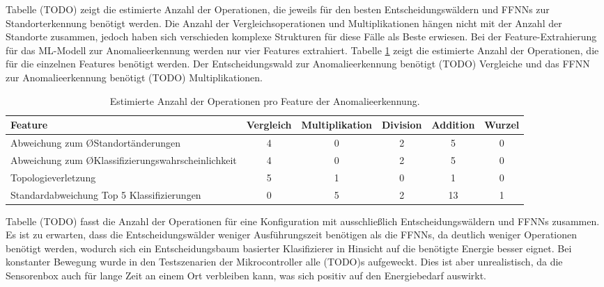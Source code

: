 \newline
\newline
Tabelle (TODO) zeigt die estimierte Anzahl der Operationen, die jeweils für den besten Entscheidungswäldern und FFNNs zur Standorterkennung benötigt werden.
Die Anzahl der Vergleichsoperationen und Multiplikationen hängen nicht mit der Anzahl der Standorte zusammen,
jedoch haben sich verschieden komplexe Strukturen für diese Fälle als Beste erwiesen.
\newline
\newline
Bei der Feature-Extrahierung für das ML-Modell zur Anomalieerkennung werden nur vier Features extrahiert.
Tabelle \ref{tab:anomaly_feature_operation_complexity} zeigt die estimierte Anzahl der Operationen, die für die einzelnen Features benötigt werden.
Der Entscheidungswald zur Anomalieerkennung benötigt (TODO) Vergleiche und das FFNN zur Anomalieerkennung benötigt (TODO) Multiplikationen.
\begin{table}[h!]
    \centering
    \begin{tabular}{ | p{4.5cm} | c | c | c | c | c | }
        \hline
        Feature & Vergleich & Multiplikation & Division & Addition & Wurzel \\\hline
        Abweichung zum ØStandortänderungen & 4 & 0 & 2 & 5 & 0 \\\hline
        Abweichung zum ØKlassifizierungswahrscheinlichkeit & 4 & 0 & 2 & 5 & 0 \\\hline
        Topologieverletzung & 5 & 1 & 0 & 1 & 0 \\\hline
        Standardabweichung Top 5 Klassifizierungen & 0 & 5 & 2 & 13 & 1 \\\hline
    \end{tabular}
    \caption{Estimierte Anzahl der Operationen pro Feature der Anomalieerkennung.}
    \label{tab:anomaly_feature_operation_complexity}
\end{table}
\newline
\newline
Tabelle (TODO) fasst die Anzahl der Operationen für eine Konfiguration mit ausschließlich Entscheidungswäldern und FFNNs zusammen.
Es ist zu erwarten, dass die Entscheidungswälder weniger Ausführungszeit benötigen als die FFNNs, da deutlich weniger Operationen benötigt werden,
wodurch sich ein Entscheidungsbaum basierter Klasifizierer in Hinsicht auf die benötigte Energie besser eignet.
Bei konstanter Bewegung wurde in den Testszenarien der Mikrocontroller alle (TODO)s aufgeweckt.
Dies ist aber unrealistisch, da die Sensorenbox auch für lange Zeit an einem Ort verbleiben kann, was sich positiv auf den Energiebedarf auswirkt.